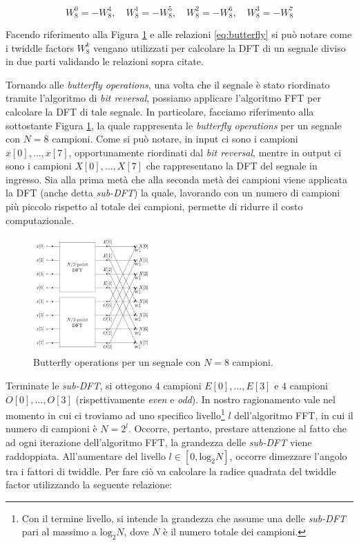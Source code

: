 \documentclass[a4paper,12pt]{report}  %
\begin{document}
\begin{equation}
    W_8^0 = -W_8^4, \quad W_8^1 = -W_8^5, \quad W_8^2 = -W_8^6, \quad W_8^3 = -W_8^7 \nonumber
\end{equation}

Facendo riferimento alla Figura \ref{fig:butterfly} e alle relazioni \eqref{eq:butterfly} si può notare come i twiddle factors $W_8^k$ vengano utilizzati per calcolare la DFT di un segnale diviso in due parti validando le relazioni sopra citate.

Tornando alle \textit{butterfly operations}, una volta che il segnale è stato riordinato tramite l'algoritmo di \textit{bit reversal}, possiamo applicare l'algoritmo FFT per calcolare la DFT di tale segnale.
In particolare, facciamo riferimento alla sottostante Figura \ref{fig:butterfly}, la quale rappresenta le \textit{butterfly operations} per un segnale con $N = 8$ campioni.
Come si può notare, in input ci sono i campioni $x[0], \dots, x[7]$, opportunamente riordinati dal \textit{bit reversal}, mentre in output ci sono i campioni $X[0], \dots, X[7]$ che rappresentano la DFT del segnale in ingresso.
Sia alla prima metà che alla seconda metà dei campioni viene applicata la DFT (anche detta \textit{sub-DFT}) la quale, lavorando con un numero di campioni più piccolo rispetto al totale dei campioni, permette di ridurre il costo computazionale.

\begin{figure}[h]
    \centering
    \includegraphics[width=0.4\textwidth]{imgs/DIT-FFT-butterfly.png}
    \caption{Butterfly operations per un segnale con $N = 8$ campioni.}
    \label{fig:butterfly}
\end{figure}

Terminate le \textit{sub-DFT}, si ottegono $4$ campioni $E[0], \dots, E[3]$ e $4$ campioni $O[0], \dots, O[3]$ (rispettivamente \textit{even} e \textit{odd}).
In nostro ragionamento vale nel momento in cui ci troviamo ad uno specifico livello\footnote{Con il termine livello, si intende la grandezza che assume una delle \textit{sub-DFT} pari al massimo a $\text{log}_2 N$, dove $N$ è il numero totale dei campioni.} $l$ dell'algoritmo FFT, in cui il numero di campioni è $N = 2^l$.
Occorre, pertanto, prestare attenzione al fatto che ad ogni iterazione dell'algoritmo FFT, la grandezza delle \textit{sub-DFT} viene raddoppiata.
All'aumentare del livello $l \in [0, \text{log}_2 N]$, occorre dimezzare l'angolo tra i fattori di twiddle.
Per fare ciò va calcolare la radice quadrata del twiddle factor utilizzando la seguente relazione:
\end{document}
